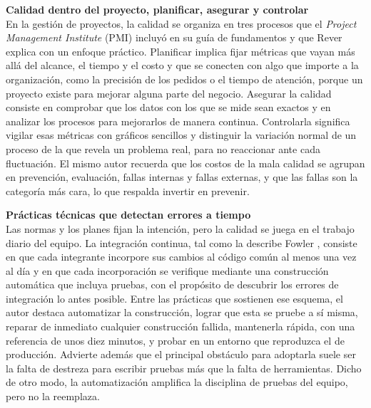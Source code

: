 \documentclass[12pt,letterpaper]{article}
\begin{document}
\textbf{Calidad dentro del proyecto, planificar, asegurar y controlar}\\
En la gestión de proyectos, la calidad se organiza en tres procesos que el \textit{Project Management Institute} (PMI) incluyó en su guía de fundamentos y que Rever \parencite*{rever_2007} explica con un enfoque práctico. Planificar implica fijar métricas que vayan más allá del alcance, el tiempo y el costo y que se conecten con algo que importe a la organización, como la precisión de los pedidos o el tiempo de atención, porque un proyecto existe para mejorar alguna parte del negocio. Asegurar la calidad consiste en comprobar que los datos con los que se mide sean exactos y en analizar los procesos para mejorarlos de manera continua. Controlarla significa vigilar esas métricas con gráficos sencillos y distinguir la variación normal de un proceso de la que revela un problema real, para no reaccionar ante cada fluctuación. El mismo autor recuerda que los costos de la mala calidad se agrupan en prevención, evaluación, fallas internas y fallas externas, y que las fallas son la categoría más cara, lo que respalda invertir en prevenir.

\textbf{Prácticas técnicas que detectan errores a tiempo}\\
Las normas y los planes fijan la intención, pero la calidad se juega en el trabajo diario del equipo. La integración continua, tal como la describe Fowler \parencite*{fowler_ci_2024}, consiste en que cada integrante incorpore sus cambios al código común al menos una vez al día y en que cada incorporación se verifique mediante una construcción automática que incluya pruebas, con el propósito de descubrir los errores de integración lo antes posible. Entre las prácticas que sostienen ese esquema, el autor destaca automatizar la construcción, lograr que esta se pruebe a sí misma, reparar de inmediato cualquier construcción fallida, mantenerla rápida, con una referencia de unos diez minutos, y probar en un entorno que reproduzca el de producción. Advierte además que el principal obstáculo para adoptarla suele ser la falta de destreza para escribir pruebas más que la falta de herramientas. Dicho de otro modo, la automatización amplifica la disciplina de pruebas del equipo, pero no la reemplaza.
\end{document}
